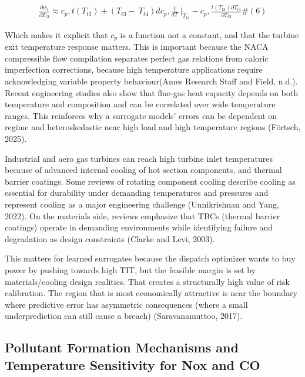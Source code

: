 \documentclass[11pt]{article}
\begin{document}
\[\begin{array}{r}
\frac{\partial w_{t}}{\partial T_{t3}} \approx c_{p},t\left( T_{t3} \right) + \left( T_{t3} - \ T_{t4} \right)dc_{p},\frac{t}{dT}\left. \  \right|_{T_{t3}} - c_{p},\frac{t\left( T_{t3} \right)\partial T_{t4}}{\partial T_{t3}}\#(6)
\end{array}\]

Which makes it explicit that \(c_{p}\) is a function not a constant, and
that the turbine exit temperature response matters. This is important
because the NACA compressible flow compilation separates perfect gas
relations from caloric imperfection corrections, because high
temperature applications require acknowledging variable property
behaviour(Ames Research Staff and Field, n.d.). Recent engineering
studies also show that flue-gas heat capacity depends on both
temperature and composition and can be correlated over wide temperature
ranges. This reinforces why a surrogate models' errors can be dependent
on regime and heteroskedastic near high load and high temperature
regions (Förtsch, 2025).

Industrial and aero gas turbines can reach high turbine inlet
temperatures because of advanced internal cooling of hot section
components, and thermal barrier coatings. Some reviews of rotating
component cooling describe cooling as essential for durability under
demanding temperatures and pressures and represent cooling as a major
engineering challenge (Unnikrishnan and Yang, 2022). On the materials
side, reviews emphasize that TBCs (thermal barrier coatings) operate in
demanding environments while identifying failure and degradation as
design constraints (Clarke and Levi, 2003).

This matters for learned surrogates because the dispatch optimizer wants
to buy power by pushing towards high TIT, but the feasible margin is set
by materials/cooling design realities. That creates a structurally high
value of risk calibration. The region that is most economically
attractive is near the boundary where predictive error has asymmetric
consequences (where a small underprediction can still cause a breach)
(Saravanamuttoo, 2017).

\subsection{Pollutant Formation Mechanisms and Temperature Sensitivity
for Nox and
CO}\label{pollutant-formation-mechanisms-and-temperature-sensitivity-for-nox-and-co}
\end{document}

